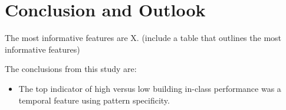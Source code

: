 \section{Conclusion and Outlook}
\label{sec:conclusion}

The most informative features are X. (include a table that outlines the most informative features)

The conclusions from this study are:

\begin{itemize}
\item The top indicator of high versus low building in-class performance was a temporal feature using pattern specificity.
\end{itemize}

